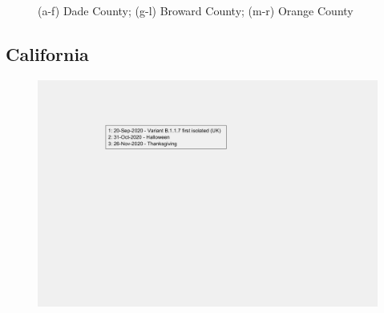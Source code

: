 \documentclass[]{article}
\begin{document}
\begin{figure}
		\caption{(a-f) Dade County; (g-l) Broward County; (m-r) Orange County}
	\label{fig:foobar}
\end{figure}
\FloatBarrier
\vspace{5mm}

\subsection{California}

\begin{figure}[!h]
	\includegraphics[width=\linewidth]{legends/B117_legend.png}
	\caption{}
	\label{fig:legends/B117_legendLabel}
\end{figure}
\end{document}
